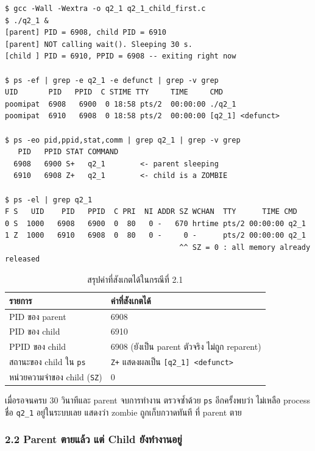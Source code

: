 \documentclass[a4paper,12pt]{article}
\newcommand{\code}[1]{\texttt{#1}}
\begin{document}
\begin{lstlisting}[style=terminal,caption={ผลลัพธ์และสถานะจาก \texttt{ps} ในกรณีที่ 2.1}]
$ gcc -Wall -Wextra -o q2_1 q2_1_child_first.c
$ ./q2_1 &
[parent] PID = 6908, child PID = 6910
[parent] NOT calling wait(). Sleeping 30 s.
[child ] PID = 6910, PPID = 6908 -- exiting right now

$ ps -ef | grep -e q2_1 -e defunct | grep -v grep
UID       PID   PPID  C STIME TTY     TIME     CMD
poomipat  6908   6900  0 18:58 pts/2  00:00:00 ./q2_1
poomipat  6910   6908  0 18:58 pts/2  00:00:00 [q2_1] <defunct>

$ ps -eo pid,ppid,stat,comm | grep q2_1 | grep -v grep
   PID   PPID STAT COMMAND
  6908   6900 S+   q2_1        <- parent sleeping
  6910   6908 Z+   q2_1        <- child is a ZOMBIE

$ ps -el | grep q2_1
F S   UID    PID   PPID  C PRI  NI ADDR SZ WCHAN  TTY      TIME CMD
0 S  1000   6908   6900  0  80   0 -   670 hrtime pts/2 00:00:00 q2_1
1 Z  1000   6910   6908  0  80   0 -     0 -      pts/2 00:00:00 q2_1
                                        ^^ SZ = 0 : all memory already released
\end{lstlisting}

\begin{table}[H]
\centering
\caption{สรุปค่าที่สังเกตได้ในกรณีที่ 2.1}
\begin{tabular}{ll}
\toprule
\textbf{รายการ} & \textbf{ค่าที่สังเกตได้} \\
\midrule
PID ของ parent & 6908 \\
PID ของ child & 6910 \\
PPID ของ child & 6908 \quad (ยังเป็น parent ตัวจริง ไม่ถูก reparent) \\
สถานะของ child ใน \code{ps} & \code{Z+} แสดงผลเป็น \code{[q2\_1] <defunct>} \\
หน่วยความจำของ child (\code{SZ}) & 0 \\
\bottomrule
\end{tabular}
\end{table}

เมื่อรอจนครบ 30 วินาทีและ parent จบการทำงาน ตรวจซ้ำด้วย \code{ps} อีกครั้งพบว่า
ไม่เหลือ process ชื่อ \code{q2\_1} อยู่ในระบบเลย แสดงว่า zombie ถูกเก็บกวาดทันที
ที่ parent ตาย

\newpage

\subsubsection{2.2 Parent ตายแล้ว แต่ Child ยังทำงานอยู่}
\end{document}
